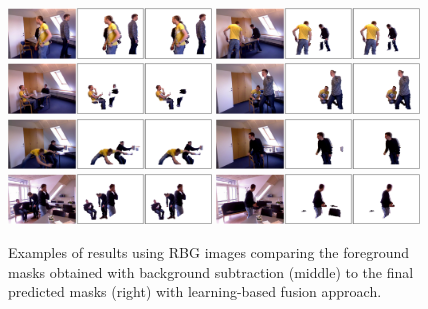 \documentclass[10pt,twocolumn,letterpaper]{article}
\begin{document}
\begin{figure}[htbp]
	\centering
		\includegraphics[width=0.48\textwidth]{results1.eps}
		\includegraphics[width=0.48\textwidth]{results2.eps}
		\includegraphics[width=0.48\textwidth]{results3.eps}
		\includegraphics[width=0.48\textwidth]{results4.eps}
		\includegraphics[width=0.48\textwidth]{results5.eps}
		\includegraphics[width=0.48\textwidth]{results6.eps}
		\includegraphics[width=0.48\textwidth]{results7.eps}
		\includegraphics[width=0.48\textwidth]{results8.eps}
	\caption{Examples of results using RBG images comparing the foreground masks obtained with background subtraction (middle) to the final predicted masks (right) with learning-based fusion approach.}
	\label{fig:results}
\end{figure}
\end{document}

